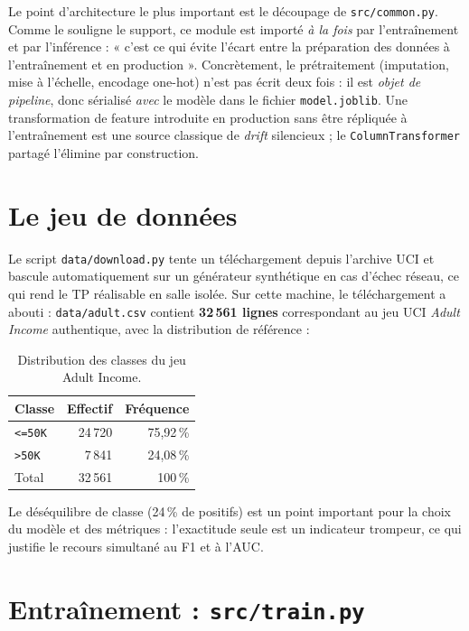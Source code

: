 \documentclass[11pt,a4paper]{report}
\begin{document}
Le point d'architecture le plus important est le découpage de
\texttt{src/common.py}. Comme le souligne le support, ce module est importé
\emph{à la fois} par l'entraînement et par l'inférence :
« c'est ce qui évite l'écart entre la préparation des données à l'entraînement
et en production ». Concrètement, le prétraitement (imputation, mise à
l'échelle, encodage one-hot) n'est pas écrit deux fois : il est \emph{objet de
pipeline}, donc sérialisé \emph{avec} le modèle dans le fichier
\texttt{model.joblib}. Une transformation de feature introduite en
production sans être répliquée à l'entraînement est une source classique de
\emph{drift} silencieux ; le \texttt{ColumnTransformer} partagé l'élimine par
construction.

\section{Le jeu de données}

Le script \texttt{data/download.py} tente un téléchargement depuis l'archive
UCI et bascule automatiquement sur un générateur synthétique en cas d'échec
réseau, ce qui rend le TP réalisable en salle isolée. Sur cette machine, le
téléchargement a abouti : \texttt{data/adult.csv} contient \textbf{32\,561
lignes} correspondant au jeu UCI \emph{Adult Income} authentique, avec la
distribution de référence :

\begin{table}[H]
\centering
\begin{tabular}{@{}lrr@{}}
\toprule
\textbf{Classe} & \textbf{Effectif} & \textbf{Fréquence} \\
\midrule
\texttt{<=50K} & 24\,720 & 75,92\,\% \\
\texttt{>50K}  & 7\,841  & 24,08\,\% \\
\midrule
Total        & 32\,561 & 100\,\% \\
\bottomrule
\end{tabular}
\caption{Distribution des classes du jeu Adult Income.}
\end{table}

Le déséquilibre de classe (24\,\% de positifs) est un point important pour la
choix du modèle et des métriques : l'exactitude seule est un indicateur
trompeur, ce qui justifie le recours simultané au F1 et à l'AUC.

\section{Entraînement : \texttt{src/train.py}}
\end{document}
